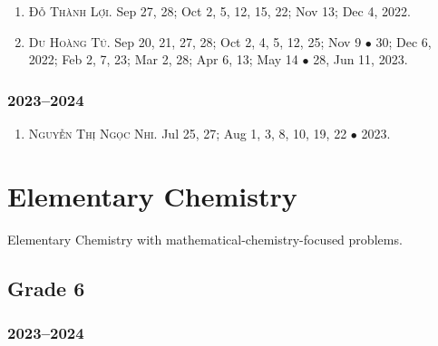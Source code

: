 \documentclass{article}
\begin{document}
\begin{enumerate}
	\item \textsc{Đỗ Thành Lợi.} {\sf[In]} Sep 27, 28; Oct 2, 5, 12, 15, 22; Nov 13; Dec 4, 2022. {\sf[Out]}
	\item \textsc{Du Hoàng Tú.} {\sf[In]} Sep 20, 21, 27, 28; Oct 2, 4, 5, 12, 25; Nov 9 $\bullet$ 30; Dec 6, 2022; Feb 2, 7, 23; Mar 2, 28; Apr 6, 13; May 14 $\bullet$ 28, Jun 11, 2023. {\sf[Out]}
\end{enumerate}

\subsubsection{2023--2024}

\begin{enumerate}
	\item \textsc{Nguyễn Thị Ngọc Nhi.} {\sf[In]} Jul 25, 27; Aug 1, 3, 8, 10, 19, 22 $\bullet$ 2023. {\sf[Out]}
\end{enumerate}


\section{Elementary Chemistry}
Elementary Chemistry with mathematical-chemistry-focused problems.

\subsection{Grade 6}

\subsubsection{2023--2024}
\end{document}
